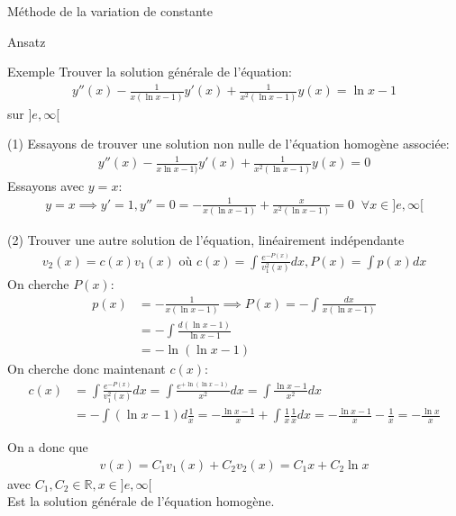 \begin{parag}{Méthode de la variation de constante}
\begin{subparag}{Ansatz}
       
       
    \end{subparag}

\end{parag}
\begin{parag}{Exemple}
    Trouver la solution générale de l'équation:
    \begin{align*}
        y''(x) - \frac{1}{x(\ln x - 1)}y'(x) + \frac{1}{x^2(\ln x - 1)}y(x) = \ln x -1
    \end{align*}
    sur $] e, \infty[$
    \begin{subparag}{(1)}
        Essayons de trouver une solution non nulle de l'équation  homogène associée:
        \begin{align*}
            y''(x) - \frac{1}{x\ln x - 1)} y'(x) + \frac{1}{x^2(\ln x - 1)}y(x) = 0
        \end{align*}
        Essayons avec $y = x$:
        \begin{align*}
            y = x \implies y' = 1, y'' = 0 = - \frac{1}{x(\ln x - 1)} + \frac{x}{x^2(\ln x - 1)} = 0 \; \; \forall x \in ] e, \infty[
        \end{align*}
    \end{subparag}
    \begin{subparag}{(2)}
        Trouver une autre solution de l'équation, linéairement indépendante
        \begin{align*}
            v_2(x) = c(x) v_1(x) \text{ où } c(x) = \int \frac{e^{-P(x)}}{v_1^2(x)}dx, P(x) = \int p(x)dx 
        \end{align*}
        On cherche $P(x)$:
        \begin{align*}
            p(x) &= - \frac{1}{x(\ln x - 1)} \implies P(x) = - \int \frac{dx}{x(\ln x- 1)}  \\
            &= - \int \frac{d(\ln x - 1)}{\ln x - 1}\\
            &= -\ln(\ln x -1)
        \end{align*}
        On cherche donc maintenant $c(x)$:
        \begin{align*}
            c(x) &= \int \frac{e^{-P(x)}}{v_1^2(x)}dx = \int \frac{e^{+\ln(\ln x - 1)}}{x^2}dx = \int \frac{\ln x - 1}{x^2} dx \\ 
                 &= - \int (\ln x - 1) d \frac{1}{x} = - \frac{\ln x - 1}{x} + \int \frac{1}{x} \frac{1}{x}dx = - \frac{\ln x- 1}{x} - \frac{1}{x} = - \frac{\ln x}{x}
        \end{align*}
    \end{subparag}
    On a donc que
    \begin{align*}
        v(x) = C_1v_1(x) + C_2v_2(x) = C_1 x + C_2 \ln x
    \end{align*}
    avec $C_1, C_2 \in \mathbb{R}, x\in ] e, \infty[$\\
    Est la solution générale de l'équation homogène.
    

\end{parag}
